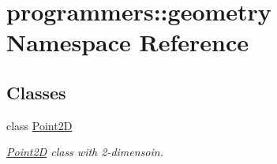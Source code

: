 \hypertarget{namespaceprogrammers_1_1geometry}{}\section{programmers\+:\+:geometry Namespace Reference}
\label{namespaceprogrammers_1_1geometry}
\subsection*{Classes}
\begin{DoxyCompactItemize}
\item 
class \hyperlink{classprogrammers_1_1geometry_1_1Point2D}{Point2D}
\begin{DoxyCompactList}\small\item\em \hyperlink{classprogrammers_1_1geometry_1_1Point2D}{Point2D} class with 2-\/dimensoin. \end{DoxyCompactList}\end{DoxyCompactItemize}
